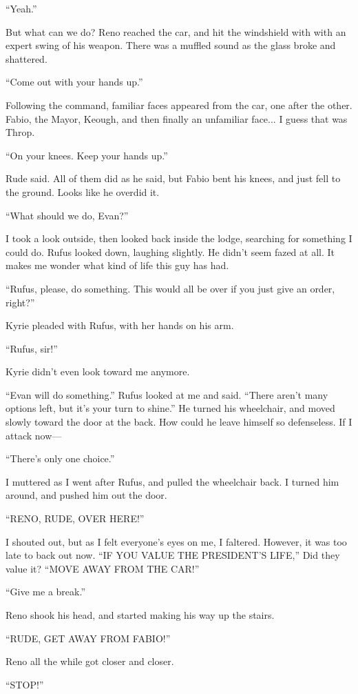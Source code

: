 \documentclass[oneside]{book}
\begin{document}
“Yeah.”

But what can we do? Reno reached the car, and hit the windshield with with an expert swing of his weapon. There was a muffled sound as the glass broke and shattered.

“Come out with your hands up.”

Following the command, familiar faces appeared from the car, one after the other. Fabio, the Mayor, Keough, and then finally an unfamiliar face... I guess that was Throp.

“On your knees. Keep your hands up.”

Rude said. All of them did as he said, but Fabio bent his knees, and just fell to the ground. Looks like he overdid it.

“What should we do, Evan?”

I took a look outside, then looked back inside the lodge, searching for something I could do. Rufus looked down, laughing slightly. He didn’t seem fazed at all. It makes me wonder what kind of life this guy has had.

“Rufus, please, do something. This would all be over if you just give an order, right?”

Kyrie pleaded with Rufus, with her hands on his arm.

“Rufus, sir!”

Kyrie didn’t even look toward me anymore.

“Evan will do something.” Rufus looked at me and said. “There aren’t many options left, but it’s your turn to shine.” He turned his wheelchair, and moved slowly toward the door at the back. How could he leave himself so defenseless. If I attack now—

“There’s only one choice.”

I muttered as I went after Rufus, and pulled the wheelchair back. I turned him around, and pushed him out the door.

“RENO, RUDE, OVER HERE!”

I shouted out, but as I felt everyone’s eyes on me, I faltered. However, it was too late to back out now. “IF YOU VALUE THE PRESIDENT’S LIFE,” Did they value it? “MOVE AWAY FROM THE CAR!”

“Give me a break.”

Reno shook his head, and started making his way up the stairs.

“RUDE, GET AWAY FROM FABIO!”

Reno all the while got closer and closer.

“STOP!”
\end{document}
